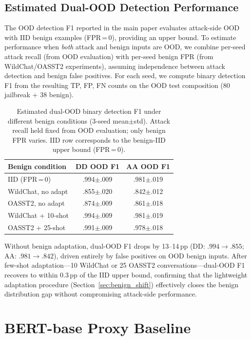 \subsection{Estimated Dual-OOD Detection Performance}
\label{app:dual_ood}

The OOD detection F1 reported in the main paper evaluates attack-side OOD with IID benign examples (FPR\,=\,0), providing an upper bound. To estimate performance when \emph{both} attack and benign inputs are OOD, we combine per-seed attack recall (from OOD evaluation) with per-seed benign FPR (from WildChat/OASST2 experiments), assuming independence between attack detection and benign false positives. For each seed, we compute binary detection F1 from the resulting TP, FP, FN counts on the OOD test composition (80 jailbreak + 38 benign).

\begin{table}[ht]
\centering
\footnotesize
\caption{Estimated dual-OOD binary detection F1 under different benign conditions (3-seed mean$\pm$std). Attack recall held fixed from OOD evaluation; only benign FPR varies. IID row corresponds to the benign-IID upper bound (FPR\,=\,0).}
\label{tab:dual_ood}
\begin{tabular}{@{}lcc@{}}
\toprule
\textbf{Benign condition} & DD OOD F1 & AA OOD F1 \\
\midrule
IID (FPR\,=\,0) & .994$\pm$.009 & .981$\pm$.019 \\
WildChat, no adapt & .855$\pm$.020 & .842$\pm$.012 \\
OASST2, no adapt & .874$\pm$.009 & .861$\pm$.018 \\
WildChat + 10-shot & .994$\pm$.009 & .981$\pm$.019 \\
OASST2 + 25-shot & .991$\pm$.009 & .978$\pm$.018 \\
\bottomrule
\end{tabular}
\end{table}

Without benign adaptation, dual-OOD F1 drops by 13--14\,pp (DD: $.994 \to .855$; AA: $.981 \to .842$), driven entirely by false positives on OOD benign inputs. After few-shot adaptation---10 WildChat or 25 OASST2 conversations---dual-OOD F1 recovers to within 0.3\,pp of the IID upper bound, confirming that the lightweight adaptation procedure (Section~\ref{sec:benign_shift}) effectively closes the benign distribution gap without compromising attack-side performance.

\section{BERT-base Proxy Baseline}
\label{app:bert_proxy}

